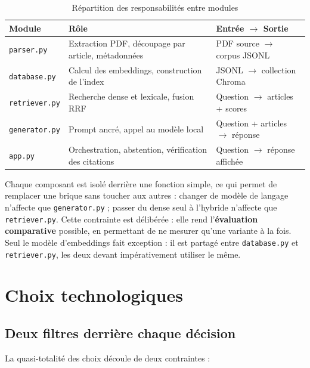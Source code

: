 \begin{table}[H]
    \centering
    \begin{tabular}{|m{2.4cm}|m{5.2cm}|m{6.4cm}|}
        \hline
        \textbf{Module} & \textbf{Rôle} & \textbf{Entrée $\rightarrow$ Sortie} \\
        \hline
        \texttt{parser.py} & Extraction PDF, découpage par article, métadonnées & PDF source $\rightarrow$ corpus JSONL \\
        \hline
        \texttt{database.py} & Calcul des embeddings, construction de l'index & JSONL $\rightarrow$ collection Chroma \\
        \hline
        \texttt{retriever.py} & Recherche dense et lexicale, fusion RRF & Question $\rightarrow$ articles + scores \\
        \hline
        \texttt{generator.py} & Prompt ancré, appel au modèle local & Question + articles $\rightarrow$ réponse \\
        \hline
        \texttt{app.py} & Orchestration, abstention, vérification des citations & Question $\rightarrow$ réponse affichée \\
        \hline
    \end{tabular}
    \caption{Répartition des responsabilités entre modules}
    \label{tab:modules}
\end{table}

Chaque composant est isolé derrière une fonction simple, ce qui permet de remplacer une brique
sans toucher aux autres : changer de modèle de langage n'affecte que \texttt{generator.py} ;
passer du dense seul à l'hybride n'affecte que \texttt{retriever.py}. Cette contrainte est
délibérée : elle rend l'\textbf{évaluation comparative} possible, en permettant de ne mesurer
qu'une variante à la fois. Seul le modèle d'embeddings fait exception : il est partagé entre
\texttt{database.py} et \texttt{retriever.py}, les deux devant impérativement utiliser le même.

\section{Choix technologiques}

\subsection{Deux filtres derrière chaque décision}

La quasi-totalité des choix découle de deux contraintes :

